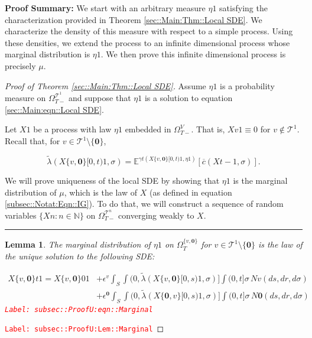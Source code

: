 \documentclass[12pt]{article}
\newcommand{\mb}{\mathbb}
\newcommand{\mc}{\mathcal}
\newcommand{\ov}{\overline}
\newcommand{\ep}{\epsilon}
\newcommand{\tr}{\textcolor{red}}
\newcommand{\labe}[1]{\tr{\texttt{Label: #1}}}
\newcommand{\pfsum}{\textbf{Proof Summary: }}
\newcommand{\ind}{\hspace{24pt}}
\newcommand{\lin}{\rule{\linewidth}{0.4 pt}}
\newcommand{\exmu}[2]{\mb{E}^{#1}\left[#2\right]}	%
\renewcommand{\root}{\mathbf{0}}				%
\renewcommand{\v}{v}							%
\renewcommand{\S}{S}							%
\newcommand{\s}{\sigma}							%
\newcommand{\ev}{\ep}							%
\newcommand{\T}{T}								%
\renewcommand{\t}{t}							%
\newcommand{\sset}{\Omega}						%
\renewcommand{\tt}{s}							%
\newcommand{\X}{X}								%
\newcommand{\vind}[1]{^{#1}}					%
\newcommand{\vsi}[1]{^{#1}}						%
\newcommand{\ts}[1]{_{#1}}						%
\newcommand{\IGrg}{\ov{c}}						%
\newcommand{\tree}{\mc{T}}						%
\newcommand{\sln}[1]{^{#1}}						%
\newcommand{\poiss}{N}							%
\renewcommand{\r}{r}							%
\newcommand{\alt}[1]{\widetilde{#1}}			%
\newcommand{\m}{\mu}							%
\newcommand{\mmm}{\eta}							%
\newcommand{\cm}{\gamma}						%
\newcommand{\crate}{\alt{\lambda}}				%
\newtheorem{lem}[thms]{Lemma}
\begin{document}
\pfsum We start with an arbitrary measure \(\mmm{}{}{1}\) satisfying the characterization provided in Theorem \ref{sec::Main:Thm::Local SDE}. We characterize the density of this measure with respect to a simple process. Using these densities, we extend the process to an infinite dimensional process whose marginal distribution is \(\mmm{}{}{1}\). We then prove this infinite dimensional process is precisely \(\m{}{}{}\).

\begin{proof}[Proof of Theorem \ref{sec::Main:Thm::Local SDE}]

Assume \(\mmm{}{}{1}\) is a probability measure on \(\sset\vsi{\tree\sln{1}}\ts{\T-}\) and suppose that \(\mmm{}{}{1}\) is a solution to equation \eqref{sec::Main:eqn::Local SDE}.

\ind Let \(\X{}{}{1}\) be a process with law \(\mmm{}{}{1}\) embedded in \(\sset\vsi{V}\ts{\T-}\). That is, \(\X{\v}{}{1} \equiv 0\) for \(\v \notin \tree\sln{1}\). Recall that, for \(\v \in \tree\sln{1}\setminus\{\root\}\),

\[\crate{}{}(\X{\{\v,\root\}}{[0,\t)}{1},\s) = \exmu{\cm{\t}(\X{\{\v,\root\}}{[0,\t)}{1},\mmm{}{}{1})}{\IGrg{}(\X{}{\t-}{1},\s)}.\]

\ind We will prove uniqueness of the local SDE by showing that \(\mmm{}{}{1}\) is the marginal distribution of \(\m{}{}{}\), which is the law of \(\X{}{}\) (as defined in equation \eqref{subsec::Notat:Eqn::IG}). To do that, we will construct a sequence of random variables \(\{\X{}{}{n}:n\in\mb{N}\}\) on \(\sset\vsi{\tree\sln{n}}\ts{\T-}\) converging weakly to \(\X{}{}\). 

\lin

\begin{lem}
The marginal distribution of \(\mmm{}{}{1}\) on \(\sset\vsi{\{\v,\root\}}\ts{\T}\) for \(\v \in \tree\sln{1}\setminus\{\root\}\) is the law of the unique solution to the following SDE:

\begin{align}
\X{\{\v,\root\}}{\t}{1} = \X{\{\v,\root\}}{0}{1} &+ \ev\vind{\v}\int_\S\int{(0,\crate{}{}(\X{\{\v,\root\}}{[0,\tt)}{1},\s)]}\int{(0,\t]}\s\,\poiss{\v}(d\tt,d\r,d\s)\nonumber\\
&+ \ev\vind{\root}\int_\S\int{(0,\crate{}{}(\X{\{\root,\v\}}{[0,\tt)}{1},\s)]}\int{(0,\t]}\s\,\poiss{\root}(d\tt,d\r,d\s)
\label{subsec::ProofU:eqn::Marginal}
\end{align}
\labe{subsec::ProofU:eqn::Marginal}
\label{subsec::ProofU:Lem::Marginal}
\end{lem}
\labe{subsec::ProofU:Lem::Marginal}


\end{proof}
\end{document}
